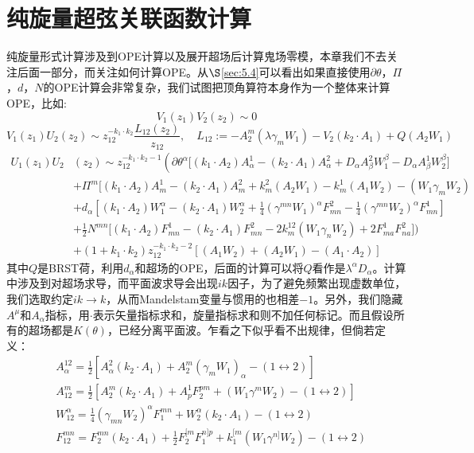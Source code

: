 \section{纯旋量超弦关联函数计算}
纯旋量形式计算涉及到OPE计算以及展开超场后计算鬼场零模，本章我们不去关注后面一部分，而关注如何计算OPE。从$\S$\ref{sec:5.4}可以看出如果直接使用$\partial\theta$，$\Pi$，$d$，$N$的OPE计算会非常复杂，我们试图把顶角算符本身作为一个整体来计算OPE，比如:
\begin{equation}
	V_1(z_1)V_2(z_2)\sim 0
\end{equation}
\begin{equation}
	\label{eq:6.17}
	V_1(z_1)U_2(z_2)\sim z_{12}^{-k_1\cdot k_2}\frac{L_{12}(z_2)}{z_{12}},\quad L_{12}:=-A_2^m(\lambda\gamma_mW_1)-V_2(k_2\cdot A_1)+Q(A_2W_1)
\end{equation}
\begin{equation}
	\label{eq:6.18}
	\begin{aligned}
		U_1(z_1)U_2&(z_2)\sim z_{12}^{-k_1\cdot k_2-1}\left(\partial\theta^\alpha\Big[(k_1\cdot A_2)A_\alpha^1-(k_2\cdot A_1)A_\alpha^2+D_\alpha A_\beta^2W_1^\beta-D_\alpha A_\beta^1W_2^\beta\Big]\right.\\&+\Pi^m\Big[(k_1\cdot A_2)A_m^1-(k_2\cdot A_1)A_m^2+k_m^2(A_2W_1)-k_m^1(A_1W_2)-(W_1\gamma_mW_2)\\&+d_\alpha\left[(k_1\cdot A_2)W_1^\alpha-(k_2\cdot A_1)W_2^\alpha+\frac14(\gamma^{mn}W_1)^\alpha F_{mn}^2-\frac14(\gamma^{mn}W_2)^\alpha F_{mn}^1\right]\\&+\frac12N^{mn}\Big[(k_1\cdot A_2)F_{mn}^1-(k_2\cdot A_1)F_{mn}^2-2k_m^{12}(W_1\gamma_nW_2)+2F_{ma}^1F_{na}^2\Big]\Big)\\&+(1+k_1\cdot k_2)z_{12}^{-k_1\cdot k_2-2}\left[(A_1W_2)+(A_2W_1)-(A_1\cdot A_2)\right]
	\end{aligned}
\end{equation}
其中$Q$是BRST荷，利用$d_\alpha$和超场的OPE，后面的计算可以将$Q$看作是$\lambda^\alpha D_\alpha$。计算中涉及到对超场求导，而平面波求导会出现$ik$因子，为了避免频繁出现虚数单位，我们选取约定$ik\to k$，从而Mandelstam变量与惯用的也相差$-1$。另外，我们隐藏$A^\mu$和$A_\alpha$指标，用$\cdot$表示矢量指标求和，旋量指标求和则不加任何标记。而且假设所有的超场都是$K(\theta)$，已经分离平面波。乍看之下似乎看不出规律，但倘若定义：
\begin{equation}
	\label{eq:6.19}
	\begin{aligned}
		&A_\alpha^{12}=\frac{1}{2}\left[A_\alpha^2(k_2\cdot A_1)+A_2^m(\gamma_mW_1)_\alpha-(1\leftrightarrow2)\right]
		\\&A_{12}^m=\frac{1}{2}\left[A_2^m(k_2\cdot A_1)+A_p^1F_2^{pm}+(W_1\gamma^mW_2)-(1\leftrightarrow2)\right]
		\\&W_{12}^{\alpha}=\frac{1}{4}(\gamma_{mn}W_2)^\alpha F_1^{mn}+W_2^\alpha(k_2\cdot A_1)-(1\leftrightarrow2)
		\\&F_{12}^{mn}=F_2^{mn}(k_2\cdot A_1)+\frac{1}{2}F_2^{[m}F_1^{n]p}+k_1^{[m}(W_1\gamma^{n]}W_2)-(1\leftrightarrow2)
	\end{aligned}
\end{equation}
